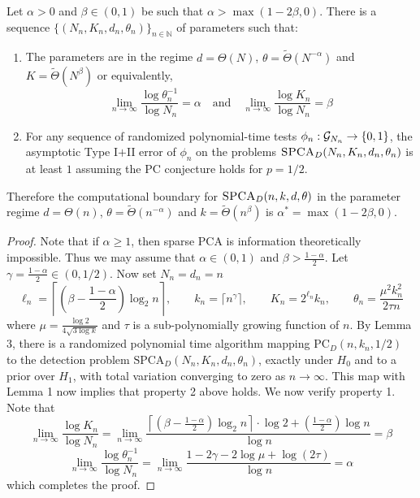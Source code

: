 \documentclass[11pt]{article}
\begin{document}
\begin{theorem}
Let $\alpha > 0$ and $\beta \in (0, 1)$ be such that $\alpha > \max(1 - 2\beta, 0)$. There is a sequence $\{ (N_n, K_n, d_n, \theta_n) \}_{n \in \mathbb{N}}$ of parameters such that:
\begin{enumerate}
\item The parameters are in the regime $d = \Theta(N)$, $\theta = \tilde{\Theta}(N^{-\alpha})$ and $K = \tilde{\Theta}(N^\beta)$ or equivalently,
$$\lim_{n \to \infty} \frac{\log \theta_n^{-1}}{\log N_n} = \alpha \quad \text{and} \quad \lim_{n \to \infty} \frac{\log K_n}{\log N_n} = \beta$$
\item For any sequence of randomized polynomial-time tests $\phi_n : \mathcal{G}_{N_n} \to \{0, 1\}$, the asymptotic Type I$+$II error of $\phi_n$ on the problems $\textsc{SPCA}_D(N_n, K_n, d_n, \theta_n)$ is at least $1$ assuming the PC conjecture holds for $p = 1/2$.
\end{enumerate}
Therefore the computational boundary for $\textsc{SPCA}_D(n, k, d, \theta)$ in the parameter regime $d = \Theta(n)$, $\theta = \tilde{\Theta}(n^{-\alpha})$ and $k = \tilde{\Theta}(n^\beta)$ is $\alpha^* = \max(1 - 2 \beta, 0)$.
\end{theorem}

\begin{proof}
Note that if $\alpha \ge 1$, then sparse PCA is information theoretically impossible. Thus we may assume that $\alpha \in (0, 1)$ and $\beta > \frac{1 - \alpha}{2}$. Let $\gamma = \frac{1 - \alpha}{2} \in (0, 1/2)$. Now set $N_n = d_n = n$
$$\ell_n = \left\lceil \left( \beta - \frac{1 - \alpha}{2} \right) \log_2 n \right\rceil, \quad \quad k_n = \lceil n^{\gamma} \rceil, \quad \quad K_n = 2^{\ell_n} k_n, \quad \quad \theta_n = \frac{\mu^2 k_n^2}{2 \tau n}$$
where $\mu = \frac{\log 2}{4\sqrt{3 \log k}}$ and $\tau$ is a sub-polynomially growing function of $n$. 
By Lemma 3, there is a randomized polynomial time algorithm mapping $\text{PC}_D(n, k_n, 1/2)$ to the detection problem $\text{SPCA}_D(N_n, K_n, d_n, \theta_n)$, exactly under $H_0$ and to a prior over $H_1$, with total variation converging to zero as $n \to \infty$. This map with Lemma 1 now implies that property 2 above holds. We now verify property 1. Note that
$$\lim_{n \to \infty} \frac{\log K_n}{\log N_n} = \lim_{n \to \infty} \frac{\left\lceil \left( \beta - \frac{1 - \alpha}{2} \right) \log_2 n \right\rceil \cdot \log 2 + \left( \frac{1 - \alpha}{2} \right) \log n}{\log n} = \beta$$
$$\lim_{n \to \infty} \frac{\log \theta_n^{-1}}{\log N_n} = \lim_{n \to \infty} \frac{1 - 2\gamma - 2 \log \mu + \log(2\tau)}{\log n} = \alpha$$
which completes the proof.
\end{proof}
\end{document}
